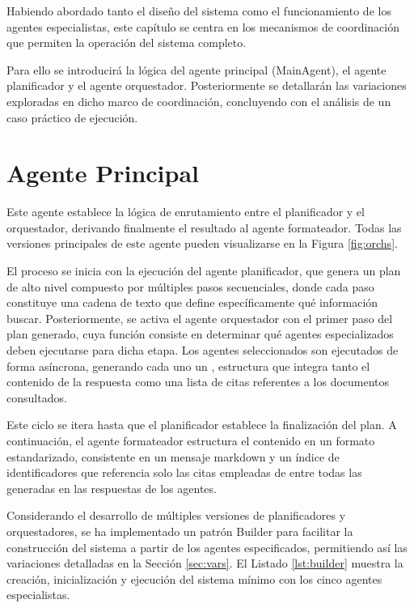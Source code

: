 Habiendo abordado tanto el diseño del sistema como el funcionamiento de los agentes especialistas, este capítulo se centra en los mecanismos de coordinación que permiten la operación del sistema completo.

Para ello se introducirá la lógica del agente principal (MainAgent), el agente planificador y el agente orquestador. Posteriormente se detallarán las variaciones exploradas en dicho marco de coordinación, concluyendo con el análisis de un caso práctico de ejecución.

\section{Agente Principal}
\label{sec:principal}
Este agente establece la lógica de enrutamiento entre el planificador y el orquestador, derivando finalmente el resultado al agente formateador. Todas las versiones principales de este agente pueden visualizarse en la Figura \ref{fig:orchs}.

El proceso se inicia con la ejecución del agente planificador, que genera un plan de alto nivel compuesto por múltiples pasos secuenciales, donde cada paso constituye una cadena de texto que define específicamente qué información buscar. Posteriormente, se activa el agente orquestador con el primer paso del plan generado, cuya función consiste en determinar qué agentes especializados deben ejecutarse para dicha etapa. Los agentes seleccionados son ejecutados de forma asíncrona, generando cada uno un , estructura que integra tanto el contenido de la respuesta como una lista de citas referentes a los documentos consultados.

Este ciclo se itera hasta que el planificador establece la finalización del plan. A continuación, el agente formateador estructura el contenido en un formato estandarizado, consistente en un mensaje markdown y un índice de identificadores que referencia solo las citas empleadas de entre todas las generadas en las respuestas de los agentes.

Considerando el desarrollo de múltiples versiones de planificadores y orquestadores, se ha implementado un patrón Builder para facilitar la construcción del sistema a partir de los agentes especificados, permitiendo así las variaciones detalladas en la Sección \ref{sec:vars}. El Listado \ref{lst:builder} muestra la creación, inicialización y ejecución del sistema mínimo con los cinco agentes especialistas.

